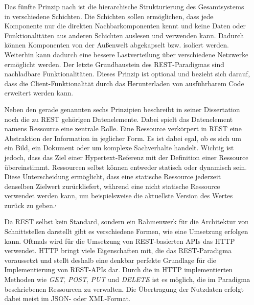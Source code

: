 Das fünfte Prinzip nach \citeauthor{MS-Fielding.} ist die hierarchische Strukturierung des Gesamtsystems in verschiedene Schichten. 
Die Schichten sollen ermöglichen, dass jede Komponente nur die direkten Nachbarkomponenten kennt und keine Daten oder Funktionalitäten aus anderen Schichten auslesen und verwenden kann.
Dadurch können Komponenten von der Außenwelt abgekapselt bzw. isoliert werden.
Weiterhin kann dadurch eine bessere Lastverteilung über verschiedene Netzwerke ermöglicht werden.
Der letzte Grundbaustein des \ac{REST}-Paradigmas sind nachladbare Funktionalitäten.
Dieses Prinzip ist optional und bezieht sich darauf, dass die Client-Funktionalität durch das Herunterladen von ausführbarem Code erweitert werden kann. 

Neben den gerade genannten sechs Prinzipien beschreibt \citeauthor{MS-Fielding.} in seiner Dissertation noch die zu \ac{REST} gehörigen Datenelemente. 
Dabei spielt das Datenelement namens Ressource eine zentrale Rolle.
Eine Ressource verkörpert in \ac{REST} eine Abstraktion der Information in jeglicher Form.
Es ist dabei egal, ob es sich um ein Bild, ein Dokument oder um komplexe Sachverhalte handelt. 
Wichtig ist jedoch, dass das Ziel einer Hypertext-Referenz mit der Definition einer Ressource übereinstimmt.
Ressourcen selbst können entweder statisch oder dynamisch sein.
Diese Unterscheidung ermöglicht, dass eine statische Ressource jederzeit denselben Zielwert zurückliefert, während eine nicht statische Ressource verwendet werden kann, um beispielsweise die aktuellste Version des Wertes zurück zu geben.\autocite[Vgl.][S. 86-90]{MS-Fielding.}$^,$\autocite{rf-richardson2013restful}

Da \ac{REST} selbst kein Standard, sondern ein Rahmenwerk für die Architektur von Schnittstellen darstellt gibt es verschiedene Formen, wie eine Umsetzung erfolgen kann. 
Oftmals wird für die Umsetzung von \ac{REST}-basierten \acp{API} das \ac{HTTP} verwendet.
\ac{HTTP} bringt viele Eigenschaften mit, die das \ac{REST}-Paradigma voraussetzt und stellt deshalb eine denkbar perfekte Grundlage für die Implementierung von \ac{REST}-\acp{API} dar. 
Durch die in \ac{HTTP} implementierten Methoden wie \emph{GET}, \emph{POST}, \emph{PUT} und \emph{DELETE} ist es möglich, die im Paradigma beschriebenen Ressourcen zu verwalten.
Die Übertragung der Nutzdaten erfolgt dabei meist im \acs{JSON}- oder \acs{XML}-Format.\autocite[Vgl.][S. 97]{MS-Tilkov.2015} 

